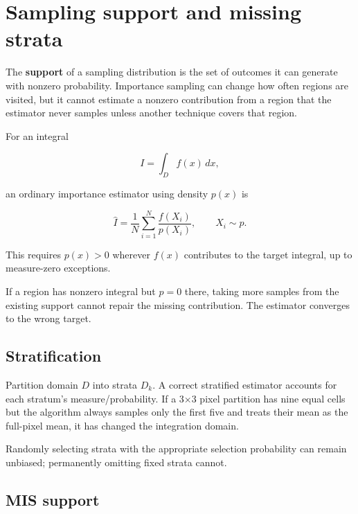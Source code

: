 \hypertarget{appendix-10308c3d753e}{}\label{referencestart:appendix-10308c3d753e}
\section{Sampling support and missing strata}\label{appendix-10308c3d753e-sampling-support-and-missing-strata}

\hypertarget{appendix-10308c3d753e-sampling-support-and-missing-strata}{}

The \textbf{support} of a sampling distribution is the set of outcomes it can generate with nonzero probability. Importance sampling can change how often regions are visited, but it cannot estimate a nonzero contribution from a region that the estimator never samples unless another technique covers that region.

For an integral

\[
I=\int_D f(x)\,dx,
\]

an ordinary importance estimator using density \(p(x)\) is

\[
\hat I=\frac1N\sum_{i=1}^N\frac{f(X_i)}{p(X_i)},
\qquad X_i\sim p.
\]

This requires \(p(x)>0\) wherever \(f(x)\) contributes to the target integral, up to measure-zero exceptions.

If a region has nonzero integral but \(p=0\) there, taking more samples from the existing support cannot repair the missing contribution. The estimator converges to the wrong target.

\subsection{Stratification}\label{appendix-10308c3d753e-stratification}

\hypertarget{appendix-10308c3d753e-stratification}{}

Partition domain \(D\) into strata \(D_k\). A correct stratified estimator accounts for each stratum's measure/probability. If a 3×3 pixel partition has nine equal cells but the algorithm always samples only the first five and treats their mean as the full-pixel mean, it has changed the integration domain.

Randomly selecting strata with the appropriate selection probability can remain unbiased; permanently omitting fixed strata cannot.

\subsection{MIS support}\label{appendix-10308c3d753e-mis-support}

